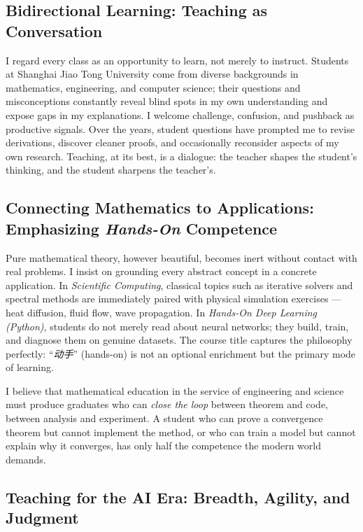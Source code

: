\documentclass[12pt, a4paper]{article}
\begin{document}
\subsection{Bidirectional Learning: Teaching as Conversation}

I regard every class as an opportunity to learn, not merely to instruct.
Students at Shanghai Jiao Tong University come from diverse backgrounds in
mathematics, engineering, and computer science; their questions and
misconceptions constantly reveal blind spots in my own understanding and
expose gaps in my explanations.
I welcome challenge, confusion, and pushback as productive signals.
Over the years, student questions have prompted me to revise derivations,
discover cleaner proofs, and occasionally reconsider aspects of my own
research.
Teaching, at its best, is a dialogue: the teacher shapes the student's
thinking, and the student sharpens the teacher's.

\subsection{Connecting Mathematics to Applications: Emphasizing \emph{Hands-On} Competence}

Pure mathematical theory, however beautiful, becomes inert without contact
with real problems.
I insist on grounding every abstract concept in a concrete application.
In \emph{Scientific Computing}, classical topics such as iterative solvers and
spectral methods are immediately paired with physical simulation exercises ---
heat diffusion, fluid flow, wave propagation.
In \emph{Hands-On Deep Learning (Python)}, students do not merely read about
neural networks; they build, train, and diagnose them on genuine datasets.
The course title captures the philosophy perfectly: ``\emph{动手}'' (hands-on)
is not an optional enrichment but the primary mode of learning.

I believe that mathematical education in the service of engineering and science
must produce graduates who can \emph{close the loop} between theorem and code,
between analysis and experiment.
A student who can prove a convergence theorem but cannot implement the method,
or who can train a model but cannot explain why it converges, has only half
the competence the modern world demands.

\subsection{Teaching for the AI Era: Breadth, Agility, and Judgment}
\end{document}
